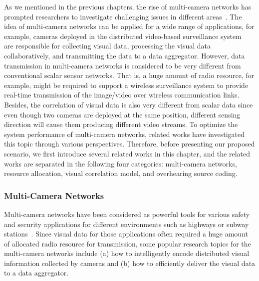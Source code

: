 As we mentioned in the previous chapters, the rise of multi-camera networks has prompted researchers to investigate challenging issues in different areas~\cite{VsnChallenges}.
The idea of multi-camera networks can be applied for a wide range of applications, for example, cameras deployed in the distributed video-based surveillance system~\cite{VideoBasedSurveillanceSystem} are responsible for collecting visual data, processing the visual data collaboratively, and transmitting the data to a data aggregator.
However, data transmission in multi-camera networks is considered to be very different from conventional scalar sensor networks.
That is, a huge amount of radio resource, for example, might be required to support a wireless surveillance system to provide real-time transmission of the image/video over wireless communication links.
Besides, the correlation of visual data is also very different from scalar data since even though two cameras are deployed at the same position, different sensing direction will cause them producing different video streams.
To optimize the system performance of multi-camera networks, related works have investigated this topic through various perspectives.
Therefore, before presenting our proposed scenario, we first introduce several related works in this chapter, and the related works are separated in the following four categories: multi-camera networks, resource allocation, visual correlation model, and overhearing source coding.
%
\subsubsection{Multi-Camera Networks}
Multi-camera networks have been considered as powerful tools for various safety and security applications for different environments such as highways or subway stations~\cite{MultiCameraNetworksBook}.
Since visual data for those applications often required a huge amount of allocated radio resource for transmission, some popular research topics for the multi-camera networks include (a) how to intelligently encode distributed visual information collected by cameras and (b) how to efficiently deliver the visual data to a data aggregator.

